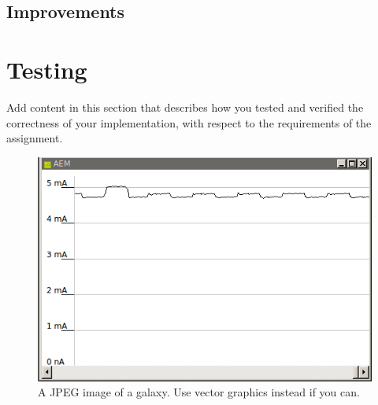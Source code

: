 \subsubsection{}

\subsection{Improvements}

\subsubsection{}

\section{Testing}
Add content in this section that describes how you tested and verified the correctness of your implementation, with respect to the requirements of the assignment.
\begin{figure}
\centering
\includegraphics[scale=1]{images/Idle_preEF.PNG}
\caption{A JPEG image of a galaxy. Use vector graphics instead if you can.}
\label{fig:universe}
\end{figure}